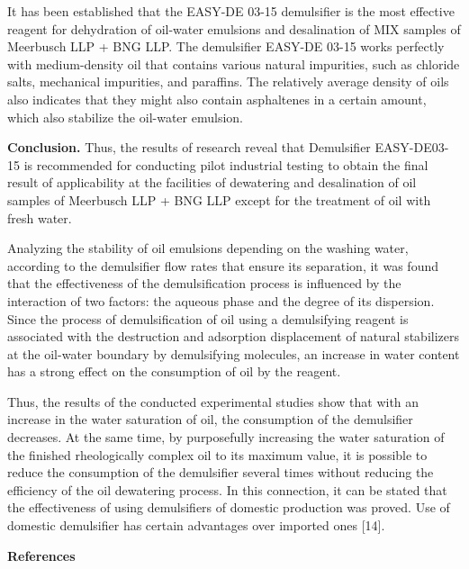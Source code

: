 \begin{multicols}{2}
It has been established that the EASY-DE 03-15 demulsifier is the most
effective reagent for dehydration of oil-water emulsions and
desalination of MIX samples of Meerbusch LLP + BNG LLP. The demulsifier
EASY-DE 03-15 works perfectly with medium-density oil that contains
various natural impurities, such as chloride salts, mechanical
impurities, and paraffins. The relatively average density of oils also
indicates that they might also contain asphaltenes in a certain amount,
which also stabilize the oil-water emulsion.

{\bfseries Conclusion.} Thus, the results of research reveal that
Demulsifier EASY-DE03-15 is recommended for conducting pilot industrial
testing to obtain the final result of applicability at the facilities of
dewatering and desalination of oil samples of Meerbusch LLP + BNG LLP
except for the treatment of oil with fresh water.

Analyzing the stability of oil emulsions depending on the washing water,
according to the demulsifier flow rates that ensure its separation, it
was found that the effectiveness of the demulsification process is
influenced by the interaction of two factors: the aqueous phase and the
degree of its dispersion. Since the process of demulsification of oil
using a demulsifying reagent is associated with the destruction and
adsorption displacement of natural stabilizers at the oil-water boundary
by demulsifying molecules, an increase in water content has a strong
effect on the consumption of oil by the reagent.

Thus, the results of the conducted experimental studies show that with
an increase in the water saturation of oil, the consumption of the
demulsifier decreases. At the same time, by purposefully increasing the
water saturation of the finished rheologically complex oil to its
maximum value, it is possible to reduce the consumption of the
demulsifier several times without reducing the efficiency of the oil
dewatering process. In this connection, it can be stated that the
effectiveness of using demulsifiers of domestic production was proved.
Use of domestic demulsifier has certain advantages over imported ones
{[}14{]}.
\end{multicols}

\begin{center}
{\bfseries References}
\end{center}

